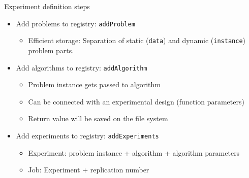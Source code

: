 \documentclass[10pt,compress,t,notes=noshow, xcolor=table]{beamer}
\begin{document}

\begin{frame}[fragile]{Experiment definition steps}
  \begin{itemize}
    \item Add problems to registry: \texttt{addProblem}
      \begin{itemize}
        \item Efficient storage: Separation of static (\texttt{data}) and dynamic (\texttt{instance}) problem parts.
      \end{itemize}
    \item Add algorithms to registry: \texttt{addAlgorithm}
      \begin{itemize}
        \item Problem instance gets passed to algorithm
        \item Can be connected with an experimental design (function parameters)
        \item Return value will be saved on the file system
      \end{itemize}
    \item Add experiments to registry: \texttt{addExperiments}
      \begin{itemize}
        \item Experiment: problem instance + algorithm + algorithm parameters
        \item Job: Experiment + replication number
      \end{itemize}
  \end{itemize}
\end{frame}
\end{document}
